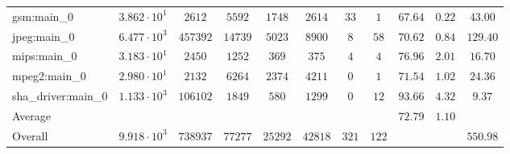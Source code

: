 \begin{tabular}{|l|c|c|c|c|c|c|c|c|c|c|}
gsm:main\_0             & $ 3.862 \cdot 10^{1} $ & $ 2612   $ & $ 5592  $ & $ 1748  $ & $ 2614  $ & $ 33  $ & $ 1   $ & $ 67.64       $ & $ 0.22    $ & $ 43.00   $ \\
jpeg:main\_0            & $ 6.477 \cdot 10^{3} $ & $ 457392 $ & $ 14739 $ & $ 5023  $ & $ 8900  $ & $ 8   $ & $ 58  $ & $ 70.62       $ & $ 0.84    $ & $ 129.40  $ \\
mips:main\_0            & $ 3.183 \cdot 10^{1} $ & $ 2450   $ & $ 1252  $ & $ 369   $ & $ 375   $ & $ 4   $ & $ 4   $ & $ 76.96       $ & $ 2.01    $ & $ 16.70   $ \\
mpeg2:main\_0           & $ 2.980 \cdot 10^{1} $ & $ 2132   $ & $ 6264  $ & $ 2374  $ & $ 4211  $ & $ 0   $ & $ 1   $ & $ 71.54       $ & $ 1.02    $ & $ 24.36   $ \\
sha\_driver:main\_0     & $ 1.133 \cdot 10^{3} $ & $ 106102 $ & $ 1849  $ & $ 580   $ & $ 1299  $ & $ 0   $ & $ 12  $ & $ 93.66       $ & $ 4.32    $ & $ 9.37    $ \\
\hline
Average                 & $                    $ & $        $ & $       $ & $       $ & $       $ & $     $ & $     $ & $ 72.79       $ & $ 1.10    $ & $         $ \\
\hline
Overall                 & $ 9.918 \cdot 10^{3} $ & $ 738937 $ & $ 77277 $ & $ 25292 $ & $ 42818 $ & $ 321 $ & $ 122 $ & $             $ & $         $ & $ 550.98  $ \\
\hline
\end{tabular}
